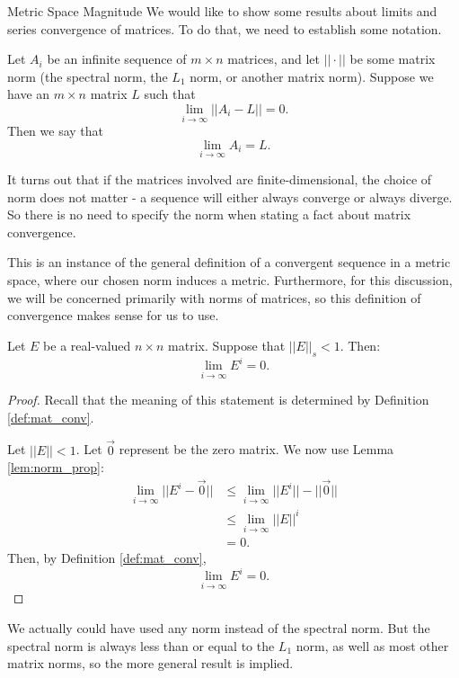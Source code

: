 \documentclass[12pt]{pom_thesis}
\begin{document}
\begin{chapter}{Metric Space Magnitude}
We would like to show some results about limits and series convergence of matrices. To do that, we need to establish some notation. 
\begin{defn}\label{def:mat_conv}
Let $A_i$ be an infinite sequence of $m \times n$ matrices, and let $||\cdot||$ be some matrix norm (the spectral norm, the $L_1$ norm, or another matrix norm). Suppose we have an $m \times n$ matrix $L$ such that 
\[
\lim_{i \rightarrow \infty} ||A_i - L|| = 0.
\]
Then we say that 
\[
\lim_{i \rightarrow \infty} A_i = L.
\]
\end{defn}
It turns out that if the matrices involved are finite-dimensional, the choice of norm does not matter - a sequence will either always converge or always diverge. So there is no need to specify the norm when stating a fact about matrix convergence.

This is an instance of the general definition of a convergent sequence in a metric space, where our chosen norm induces a metric. Furthermore, for this discussion, we will be concerned primarily with norms of matrices, so this definition of convergence makes sense for us to use.

\begin{lemma}\label{lem:lim0}
Let $E$ be a real-valued $n \times n$ matrix.  Suppose that $||E||_s < 1$. Then:
\[
\lim_{i \rightarrow \infty}E^i = 0.
\]
\end{lemma}
\begin{proof}
Recall that the meaning of this statement is determined by Definition \ref{def:mat_conv}.

Let $||E|| < 1$. Let $\vec{0}$ represent be the zero matrix. We now use Lemma \ref{lem:norm_prop}:
\begin{align*}
\lim_{i \rightarrow \infty}|| E^i - \vec{0}|| &\leq \lim_{i \rightarrow \infty}|| E^i|| - ||\vec{0}|| \\
&\leq \lim_{i \rightarrow \infty}|| E||^i\\
&= 0.
\end{align*}
Then, by Definition \ref{def:mat_conv},
\[
\lim_{i \rightarrow \infty} E^i = 0.
\]
\end{proof}
We actually could have used any norm instead of the spectral norm. But the spectral norm is always less than or equal to the $L_1$ norm, as well as most other matrix norms, so the more general result is implied.


\end{chapter}
\end{document}
